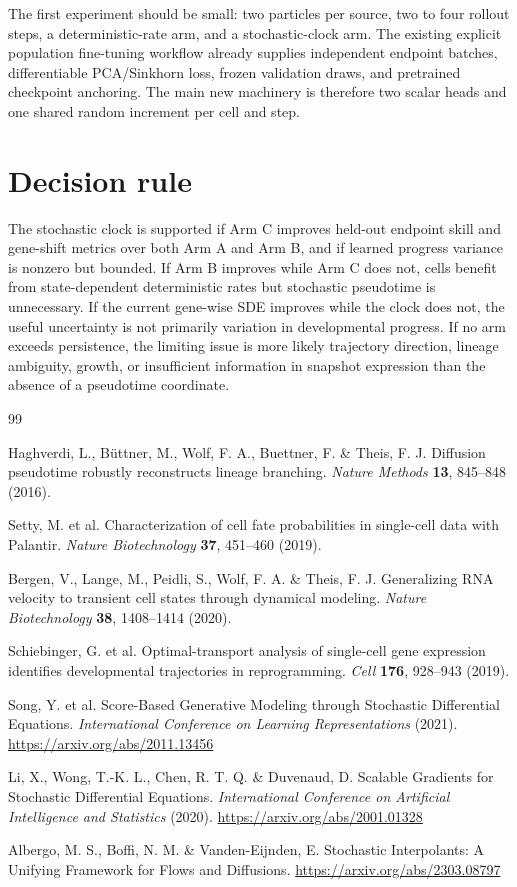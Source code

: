 \documentclass[11pt]{article}
\begin{document}
The first experiment should be small: two particles per source, two to four
rollout steps, a deterministic-rate arm, and a stochastic-clock arm. The
existing explicit population fine-tuning workflow already supplies independent
endpoint batches, differentiable PCA/Sinkhorn loss, frozen validation draws,
and pretrained checkpoint anchoring. The main new machinery is therefore two
scalar heads and one shared random increment per cell and step.

\section{Decision rule}

The stochastic clock is supported if Arm C improves held-out endpoint skill
and gene-shift metrics over both Arm A and Arm B, and if learned progress
variance is nonzero but bounded. If Arm B improves while Arm C does not, cells
benefit from state-dependent deterministic rates but stochastic pseudotime is
unnecessary. If the current gene-wise SDE improves while the clock does not,
the useful uncertainty is not primarily variation in developmental progress.
If no arm exceeds persistence, the limiting issue is more likely trajectory
direction, lineage ambiguity, growth, or insufficient information in snapshot
expression than the absence of a pseudotime coordinate.

\begin{thebibliography}{99}

Haghverdi, L., B\"uttner, M., Wolf, F. A., Buettner, F. \& Theis, F. J.
Diffusion pseudotime robustly reconstructs lineage branching.
\textit{Nature Methods} \textbf{13}, 845--848 (2016).

Setty, M. et al.
Characterization of cell fate probabilities in single-cell data with Palantir.
\textit{Nature Biotechnology} \textbf{37}, 451--460 (2019).

Bergen, V., Lange, M., Peidli, S., Wolf, F. A. \& Theis, F. J.
Generalizing RNA velocity to transient cell states through dynamical modeling.
\textit{Nature Biotechnology} \textbf{38}, 1408--1414 (2020).

Schiebinger, G. et al.
Optimal-transport analysis of single-cell gene expression identifies
developmental trajectories in reprogramming.
\textit{Cell} \textbf{176}, 928--943 (2019).

Song, Y. et al.
Score-Based Generative Modeling through Stochastic Differential Equations.
\textit{International Conference on Learning Representations} (2021).
\url{https://arxiv.org/abs/2011.13456}

Li, X., Wong, T.-K. L., Chen, R. T. Q. \& Duvenaud, D.
Scalable Gradients for Stochastic Differential Equations.
\textit{International Conference on Artificial Intelligence and Statistics}
(2020).
\url{https://arxiv.org/abs/2001.01328}

Albergo, M. S., Boffi, N. M. \& Vanden-Eijnden, E.
Stochastic Interpolants: A Unifying Framework for Flows and Diffusions.
\url{https://arxiv.org/abs/2303.08797}

\end{thebibliography}
\end{document}
